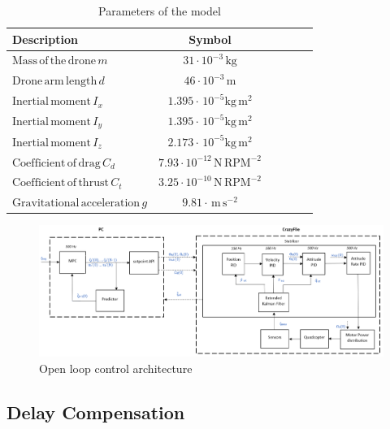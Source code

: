 \documentclass[conference]{IEEEtran}
\begin{document}
\begin{table}[htbp]
	\small
	\begin{center}
		\begin{tabular}{lccccl}\toprule
			\textbf{Description} &  \textbf{Symbol}\\
			\midrule
            $\mathrm{Mass\,of\,the\,drone} \,m$ & $\mathrm{31 \cdot 10^{-3}\,\mathrm{kg}}$  \\
			$\mathrm{Drone\,arm\,length} \,d$ & $46 \cdot \mathrm{10^{-3}}\,\mathrm{m}$ \\
			$\mathrm{Inertial\,moment} \,I_{x}$ & $1.395 \cdot\,\mathrm{10^{-5}} \mathrm{kg\,m^2}$ \\
            $\mathrm{Inertial\,moment} \,I_{y}$ & $1.395 \cdot\,\mathrm{10^{-5}} \mathrm{kg\,m^2}$ \\
            $\mathrm{Inertial\,moment} \,I_{z}$ & $2.173 \cdot\,\mathrm{10^{-5}} \mathrm{kg\,m^2}$ \\
            $\mathrm{Coefficient\,of\,drag} \,C_d$ & $\mathrm{7.93 \cdot 10^{-12}}\,\mathrm{N\,RPM^{-2}}$ \\
			$\mathrm{Coefficient\,of\,thrust} \,C_t$ & $\mathrm{3.25 \cdot 10^{-10}}\,\mathrm{N\,RPM^{-2}}$ \\
			$\mathrm{Gravitational\,acceleration} \,g$ & $\mathrm{9.81 \cdot\,m\,s^{-2}}$ \\
			\bottomrule
		\end{tabular}
	\end{center}
	\caption{Parameters of the model}
	\label{table1}
\end{table}

\begin{figure}[htbp]
	\centerline{\includegraphics[scale = 0.6]{figures/Screenshot_OL.png} }
	\caption{Open loop control architecture }
	\label{Fig2}
\end{figure}

\subsection{Delay Compensation}
\end{document}
